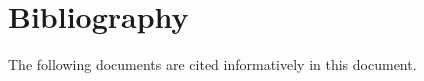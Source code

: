 
\chapter{Bibliography}

The following documents are cited informatively in this document.

\let\realglossitem\glossitem
\renewcommand{\glossitem}[4]{\hangpara{4em}{1}\realglossitem{#1}{#2}{#3}{#4}}

\clearpage
\renewcommand{\leftmark}{\indexname}
{
\raggedright
\printindex[generalindex]
}
